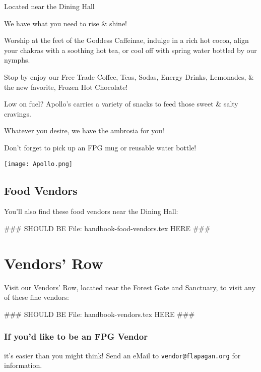 \documentclass[9pt,twoside,openright,final,article,letterpaper]{memoir}
\renewcommand{\pfbreakdisplay}{%
  \needspace{24pt}%
  \vspace{8pt}\\\ding{76}\quad\ding{77}\quad\ding{78}\\%
  \vspace{11pt}}
\let\oldsection=\section
\renewcommand{\section}[1]{%
  \nopagebreak
  \vspace{6pt} %
  \needspace{1.5in}
  \oldsection{#1}
  \nopagebreak}
\let\oldsubsection=\subsection
\renewcommand{\subsection}[1]{%
  \vspace{6pt}
  \needspace{1.25in}
  \oldsubsection{#1}
  \nopagebreak}
\let\oldsubsubsection=\subsubsection
\renewcommand{\subsubsection}[1]{%
  \needspace{.75in}
  \oldsubsubsection{#1}
  \nopagebreak}
\begin{document}
\begin{multicols}{2}
  {\small Located near the Dining Hall }

  We have what you need to rise \& shine!

  Worship at the feet of the Goddess Caffeinae, indulge in a rich hot
  cocoa, align your chakras with a soothing hot tea, or cool off with
  spring water bottled by our nymphs.

  Stop by enjoy our Free Trade Coffee, Teas, Sodas, Energy Drinks,
  Lemonades, \& the new favorite, Frozen Hot Chocolate!

  Low on fuel? Apollo's carries a variety of snacks to feed those
  sweet \& salty cravings.

  Whatever you desire, we have the ambrosia for you!

  Don't forget to pick up an FPG mug or reusable water bottle!

  \vfill

  \begin{center}
    \texttt{[image: Apollo.png]}
  \end{center}



\newpage

  \subsection{Food Vendors}

  You'll also find these food vendors near the Dining Hall:

 ### SHOULD BE File: handbook-food-vendors.tex HERE ### 



\end{multicols}

\section{Vendors' Row}

\begin{multicols}{2}

  Visit our Vendors' Row, located near the Forest Gate and Sanctuary,
  to visit any of these fine vendors:

 ### SHOULD BE File: handbook-vendors.tex HERE ### 



  \subsubsection{If you'd like to be an FPG Vendor} it's easier than
  you might think! Send an eMail to \texttt{vendor@flapagan.org} for
  information.

\end{multicols}
\end{document}
